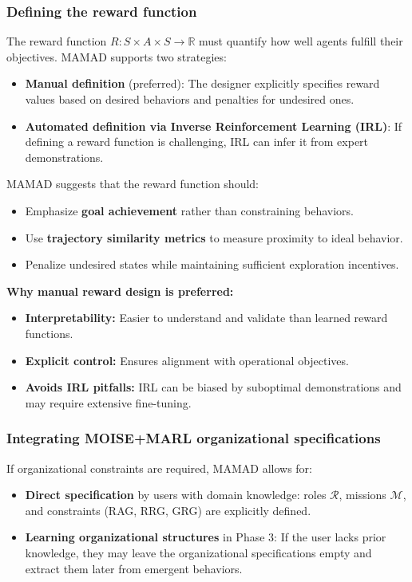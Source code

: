 \documentclass[pdflatex,sn-mathphys-num]{sn-jnl}%
\theoremstyle{thmstyleone}%
\theoremstyle{thmstyletwo}%
\theoremstyle{thmstylethree}%
\begin{document}
\subsubsection{Defining the reward function}
The reward function $R: S \times A \times S \to \mathbb{R}$ must quantify how well agents fulfill their objectives. MAMAD supports two strategies:
\begin{itemize}
    \item \textbf{Manual definition} (preferred): The designer explicitly specifies reward values based on desired behaviors and penalties for undesired ones.
    \item \textbf{Automated definition via Inverse Reinforcement Learning (IRL)}: If defining a reward function is challenging, IRL can infer it from expert demonstrations.
\end{itemize}

MAMAD suggests that the reward function should:
\begin{itemize}
    \item Emphasize \textbf{goal achievement} rather than constraining behaviors.
    \item Use \textbf{trajectory similarity metrics} to measure proximity to ideal behavior.
    \item Penalize undesired states while maintaining sufficient exploration incentives.
\end{itemize}

\noindent \textbf{Why manual reward design is preferred:}
\begin{itemize}
    \item \textbf{Interpretability:} Easier to understand and validate than learned reward functions.
    \item \textbf{Explicit control:} Ensures alignment with operational objectives.
    \item \textbf{Avoids IRL pitfalls:} IRL can be biased by suboptimal demonstrations and may require extensive fine-tuning.
\end{itemize}

\subsubsection{Integrating MOISE+MARL organizational specifications}
If organizational constraints are required, MAMAD allows for:
\begin{itemize}
    \item \textbf{Direct specification} by users with domain knowledge: roles $\mathcal{R}$, missions $\mathcal{M}$, and constraints (RAG, RRG, GRG) are explicitly defined.
    \item \textbf{Learning organizational structures} in Phase 3: If the user lacks prior knowledge, they may leave the organizational specifications empty and extract them later from emergent behaviors.
\end{itemize}
\end{document}
